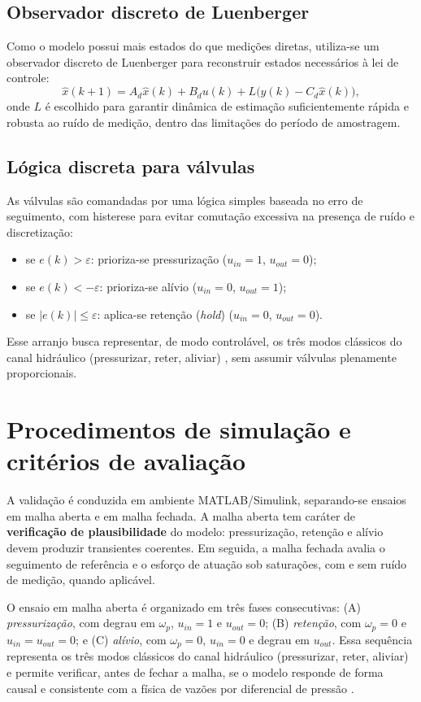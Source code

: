 \documentclass[a4paper]{ifacconf}
\begin{document}
\subsection{Observador discreto de Luenberger}
Como o modelo possui mais estados do que medições diretas, utiliza-se um observador discreto de Luenberger para reconstruir estados necessários à lei de controle:
\begin{equation}
   \hat{x}(k+1)=A_d\hat{x}(k)+B_d u(k)+L\big(y(k)-C_d\hat{x}(k)\big),
   \label{eq:luenberger}
\end{equation}
onde $L$ é escolhido para garantir dinâmica de estimação suficientemente rápida e robusta ao ruído de medição, dentro das limitações do período de amostragem.

\subsection{Lógica discreta para válvulas}
As válvulas são comandadas por uma lógica simples baseada no erro de seguimento, com histerese para evitar comutação excessiva na presença de ruído e discretização:
\begin{itemize}
   \item se $e(k)>\varepsilon$: prioriza-se pressurização ($u_{in}=1$, $u_{out}=0$);
   \item se $e(k)<-\varepsilon$: prioriza-se alívio ($u_{in}=0$, $u_{out}=1$);
   \item se $|e(k)|\le \varepsilon$: aplica-se retenção (\textit{hold}) ($u_{in}=0$, $u_{out}=0$).
\end{itemize}
Esse arranjo busca representar, de modo controlável, os três modos clássicos do canal hidráulico (pressurizar, reter, aliviar) \cite{Konrad2014}, sem assumir válvulas plenamente proporcionais.

\section{Procedimentos de simulação e critérios de avaliação}
\label{sec:simulacao}
A validação é conduzida em ambiente MATLAB/Simulink, separando-se ensaios em malha aberta e em malha fechada. A malha aberta tem caráter de \textbf{verificação de plausibilidade} do modelo: pressurização, retenção e alívio devem produzir transientes coerentes. Em seguida, a malha fechada avalia o seguimento de referência e o esforço de atuação sob saturações, com e sem ruído de medição, quando aplicável.

O ensaio em malha aberta é organizado em três fases consecutivas: (A) \textit{pressurização}, com degrau em $\omega_p$, $u_{in}=1$ e $u_{out}=0$; (B) \textit{retenção}, com $\omega_p=0$ e $u_{in}=u_{out}=0$; e (C) \textit{alívio}, com $\omega_p=0$, $u_{in}=0$ e degrau em $u_{out}$. Essa sequência representa os três modos clássicos do canal hidráulico (pressurizar, reter, aliviar) e permite verificar, antes de fechar a malha, se o modelo responde de forma causal e consistente com a física de vazões por diferencial de pressão \cite{Lv2014,HouhuaJing2022,Konrad2014}.
\end{document}
